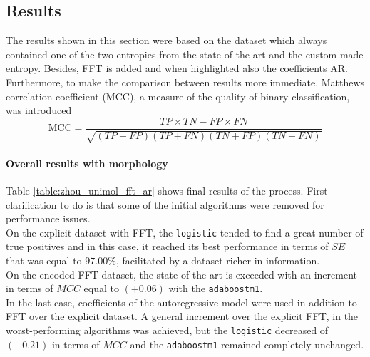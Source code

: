 \subsection{Results}
The results shown in this section were based on the dataset which always contained one of the two entropies from the state of the art and the custom-made entropy. Besides, FFT is added and when highlighted also the coefficients AR. Furthermore, to make the comparison between results more immediate, Matthews correlation coefficient (MCC), a measure of the quality of binary classification, was introduced
\begin{equation}
\mathrm{MCC}=\frac{TP \times TN-FP \times FN}{\sqrt{(TP+FP)(TP+FN)(TN+FP)(TN+FN)}}
\end{equation}
\paragraph{Overall results with morphology}
Table \ref{table:zhou_unimol_fft_ar} shows final results of the process. First clarification to do is that some of the initial algorithms were removed for performance issues.\\
On the explicit dataset with FFT, the \verb|logistic| tended to find a great number of true positives and in this case, it reached its best performance in terms of $SE$ that was equal to $97.00\%$, facilitated by a dataset richer in information.\\
On the encoded FFT dataset, the state of the art is exceeded with an increment in terms of $MCC$ equal to $(+0.06)$ with the \verb|adaboostm1|.\\
In the last case, coefficients of the autoregressive model were used in addition to FFT over the explicit dataset. A general increment over the explicit FFT, in the worst-performing algorithms was achieved, but the \verb|logistic| decreased of $(-0.21)$ in terms of $MCC$ and the \verb|adaboostm1| remained completely unchanged.\\
